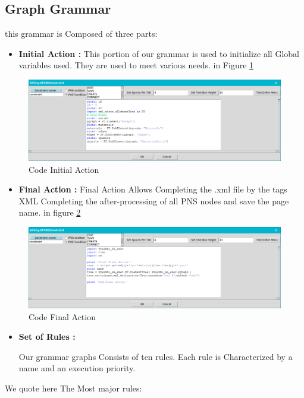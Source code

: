 \subsection{ Graph Grammar }
 this grammar is Composed of three parts: 
\begin{itemize}
\item \textbf{Initial Action : } This portion of our grammar is used to initialize all
Global variables used. They are used to meet various needs.  in Figure \ref{fig:Code Initial Action} 

\end{itemize}

\begin{figure}[th]
	\centering  %
 	\includegraphics[scale=0.8]{Chapiter3/img/InitAct}
	\caption{\label{fig:Code Initial Action}Code Initial Action}
\end{figure} 

\begin{itemize}
\item \textbf{Final Action : } Final Action Allows Completing the .xml file by the tags
XML Completing the after-processing of all PNS nodes and save the page name. in figure \ref{fig:Code Final Action} 
   
\end{itemize}

\begin{figure}[th]
	\centering  %
 	\includegraphics[scale=0.8]{Chapiter3/img/FinAct}
	\caption{\label{fig:Code Final Action}Code Final Action}
\end{figure} 
\pagebreak
\begin{itemize}
\item \textbf{ Set of Rules : } 
 
Our grammar graphs Consists of ten rules. Each
rule is Characterized by a name and an execution priority. 

\end{itemize}
 We quote here The Most major rules: 
